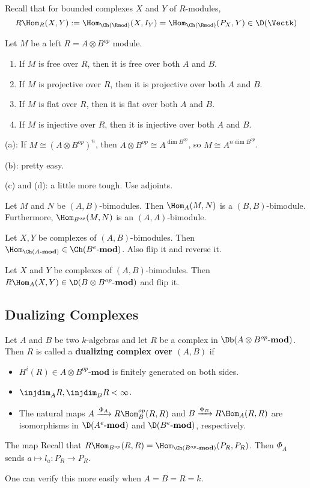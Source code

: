 \documentclass[12pt]{article}
\newcommand*{\Amod}{A\text{-}\mathbf{mod}}
\begin{document}
Recall that for bounded complexes $X$ and $Y$ of $R$-modules, 
\[R\Hom_R(X,Y):=\Hom_{\Ch(\Rmod)}(X,I_Y)=\Hom_{\Ch(\Rmod)}(P_X,Y)\in \D(\Vectk)\]
\begin{lem}
	Let $M$ be a left $R=A\otimes B^{op}$ module.
	\begin{enumerate}
		\item If $M$ is free over $R$, then it is free over both $A$ and $B$.
		\item If $M$ is projective over $R$, then it is projective over both $A$ and $B$.
		\item If $M$ is flat over $R$, then it is flat over both $A$ and $B$.
		\item If $M$ is injective over $R$, then it is injective over both $A$ and $B$.
	\end{enumerate}
\end{lem}
\begin{prf}
	(a): If $M\cong (A\otimes B^{op})^n$, then $A\otimes B^{op}\cong A^{\dim B^{op}}$, so $M\cong A^{n\dim B^{op}}$.

	(b): pretty easy.

	(c) and (d): a little more tough. Use adjoints.
\end{prf}
\begin{lem}
	Let $M$ and $N$ be $(A,B)$-bimodules. Then $\Hom_A(M,N)$ is a $(B,B)$-bimodule. Furthermore, $\Hom_{B^{op}}(M,N)$ is an $(A,A)$-bimodule.
\end{lem}
\begin{lem}
	Let $X,Y$ be complexes of $(A,B)$-bimodules. Then $\Hom_{\Ch(\Amod)}\in\Ch(B^e\text{-}\mathbf{mod})$.
	Also flip it and reverse it.
\end{lem}
\begin{lem}
	Let $X$ and $Y$ be complexes of $(A,B)$-bimodules. Then $R\Hom_A(X,Y)\in \D(B\otimes B^{op}\text{-}\mathbf{mod})$ and flip it.
\end{lem}

\subsection{Dualizing Complexes}
\begin{defn}
	Let $A$ and $B$ be two $k$-algebras and let $R$ be a complex in $\Db(A\otimes B^{op}\text{-}\mathbf{mod})$.
	Then $R$ is called a \textbf{dualizing complex over $(A,B)$} if 
	\begin{itemize}
		\item $H^i(R)\in A\otimes B^{op}\text{-}\mathbf{mod}$ is finitely generated on both sides.
		\item $\injdim_AR,\injdim_BR<\infty$.
		\item The natural maps $A\xrightarrow{\Phi_A}R\Hom_B^{op}(R,R)$ and $B\xrightarrow{\Phi_B} R\Hom_A(R,R)$
		are isomorphisms in $\D(A^e\text{-}\mathbf{mod})$ and $\D(B^e\text{-}\mathbf{mod})$, respectively.
	\end{itemize}
\end{defn}
\begin{rmk}
	The map Recall that $R\Hom_{B^{op}}(R,R)=\Hom_{\Ch(B^{op}\text{-}\mathbf{mod})}(P_R,P_R)$. Then $\Phi_A$ sends 
	$a\mapsto l_a:P_R\to P_R$.

	One can verify this more easily when $A=B=R=k$.
\end{rmk}
\end{document}
